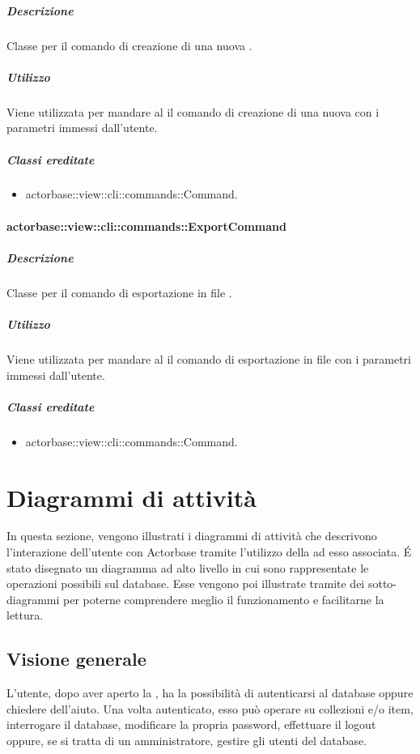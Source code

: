 \documentclass{scalatekids-article}
\begin{document}
\subparagraph{Descrizione}

Classe per il comando di creazione di una nuova .

\subparagraph{Utilizzo}

Viene utilizzata per mandare al  il comando di creazione di una nuova  con i parametri immessi dall'utente.

\subparagraph{Classi ereditate}

\begin{itemize}
\item actorbase::view::cli::commands::Command.
\end{itemize}

\paragraph{actorbase::view::cli::commands::ExportCommand}

\subparagraph{Descrizione}

Classe per il comando di esportazione in file .

\subparagraph{Utilizzo}

Viene utilizzata per mandare al  il comando di esportazione in file  con i parametri immessi dall'utente.

\subparagraph{Classi ereditate}

\begin{itemize}
\item actorbase::view::cli::commands::Command.
\end{itemize}

\section{Diagrammi di attività}
In questa sezione, vengono illustrati i diagrammi di attività che descrivono l'interazione dell'utente con Actorbase tramite l'utilizzo della  ad esso associata.
 É stato disegnato un diagramma ad alto livello in cui sono rappresentate le operazioni possibili sul database. Esse vengono poi illustrate tramite dei sotto-diagrammi per poterne comprendere meglio il funzionamento e facilitarne la lettura.

\subsection{Visione generale}
L'utente, dopo aver aperto la , ha la possibilità di autenticarsi al database oppure chiedere dell'aiuto. Una volta autenticato, esso può operare su collezioni e/o item, interrogare il database, modificare la propria password, effettuare il logout oppure, se si tratta di un amministratore, gestire gli utenti del database.
\end{document}

